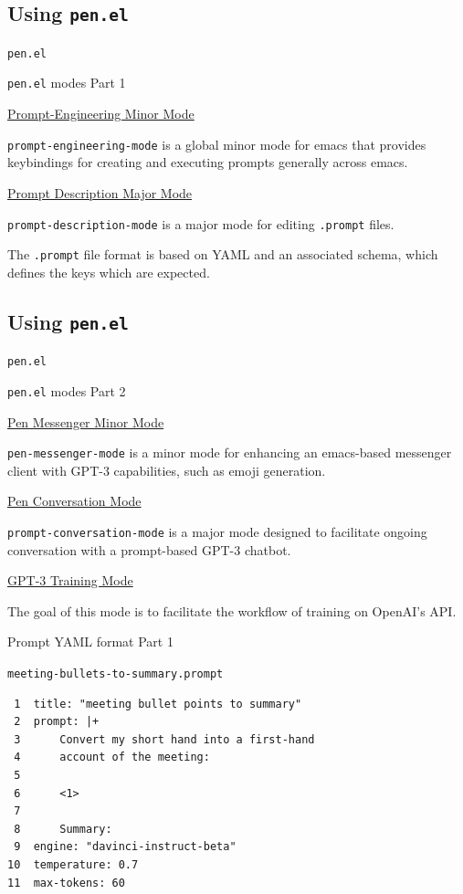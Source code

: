 \documentclass[presentation]{beamer}
\begin{document}
\subsection{Using \texttt{pen.el}}
\label{sec:org6a083ad}
\begin{frame}[label={sec:org0d5ea52},fragile]{\texttt{pen.el}}
 \begin{block}{\texttt{pen.el} modes Part 1}
{\footnotesize
\uline{\alert{Prompt-Engineering Minor Mode}}

\texttt{prompt-engineering-mode} is a global minor
mode for emacs that provides keybindings for
creating and executing prompts generally
across emacs.

\uline{\alert{Prompt Description Major Mode}}

\texttt{prompt-description-mode} is a major mode for
editing \texttt{.prompt} files.

The \texttt{.prompt} file format is based on YAML and
an associated schema, which defines the keys
which are expected.
}
\end{block}
\end{frame}

\subsection{Using \texttt{pen.el}}
\label{sec:org1e4af48}
\begin{frame}[label={sec:org8fc863a},fragile]{\texttt{pen.el}}
 \begin{block}{\texttt{pen.el} modes Part 2}
{\footnotesize
\uline{\alert{Pen Messenger Minor Mode}}

\texttt{pen-messenger-mode} is a minor mode for
enhancing an emacs-based messenger client with
GPT-3 capabilities, such as emoji generation.

\uline{\alert{Pen Conversation Mode}}

\texttt{prompt-conversation-mode} is a major mode designed to facilitate
ongoing conversation with a prompt-based GPT-3 chatbot.

\uline{\alert{GPT-3 Training Mode}}

The goal of this mode is to facilitate the
workflow of training on OpenAI's API.
}
\end{block}
\end{frame}

\begin{frame}[label={sec:org53148b3},fragile]{Prompt YAML format Part 1}
 \begin{block}{\texttt{meeting-bullets-to-summary.prompt}}
\begin{verbatim}
 1  title: "meeting bullet points to summary"
 2  prompt: |+
 3      Convert my short hand into a first-hand
 4      account of the meeting:
 5  
 6      <1>
 7  
 8      Summary:
 9  engine: "davinci-instruct-beta"
10  temperature: 0.7
11  max-tokens: 60
\end{verbatim}
\end{block}
\end{frame}
\end{document}
